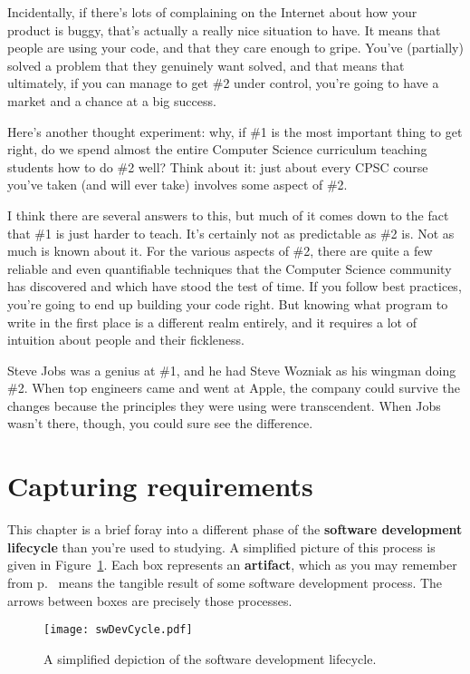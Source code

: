 Incidentally, if there's lots of complaining on the Internet about how your
product is buggy, that's actually a really nice situation to have. It means
that people are using your code, and that they care enough to gripe. You've
(partially) solved a problem that they genuinely want solved, and that means
that ultimately, if you can manage to get \#2 under control, you're going to
have a market and a chance at a big success.

Here's another thought experiment: why, if \#1 is the most important thing to
get right, do we spend almost the entire Computer Science curriculum teaching
students how to do \#2 well? Think about it: just about every CPSC course
you've taken (and will ever take) involves some aspect of \#2.

I think there are several answers to this, but much of it comes down to the
fact that \#1 is just harder to teach. It's certainly not as predictable as
\#2 is. Not as much is known about it. For the various aspects of \#2, there
are quite a few reliable and even quantifiable techniques that the Computer
Science community has discovered and which have stood the test of time. If you
follow best practices, you're going to end up building your code right. But
knowing what program to write in the first place is a different realm
entirely, and it requires a lot of intuition about people and their
fickleness. 

Steve Jobs was a genius at \#1, and he had Steve Wozniak as his wingman doing
\#2. When top engineers came and went at Apple, the company could survive the
changes because the principles they were using were transcendent. When Jobs
wasn't there, though, you could sure see the difference.

\section{Capturing requirements}

This chapter is a brief foray into a different phase of the \textbf{software
development lifecycle} than you're used to studying. A simplified picture of
this process is given in Figure~\ref{fig:swDevCycle}. Each box represents an
\textbf{artifact}, which as you may remember from p.~\pageref{artifact} means
the tangible result of some software development process. The arrows between
boxes are precisely those processes.

\begin{figure}
\centering
\texttt{[image: swDevCycle.pdf]}
\caption{A simplified depiction of the software development lifecycle.}
\label{fig:swDevCycle}
\end{figure}

